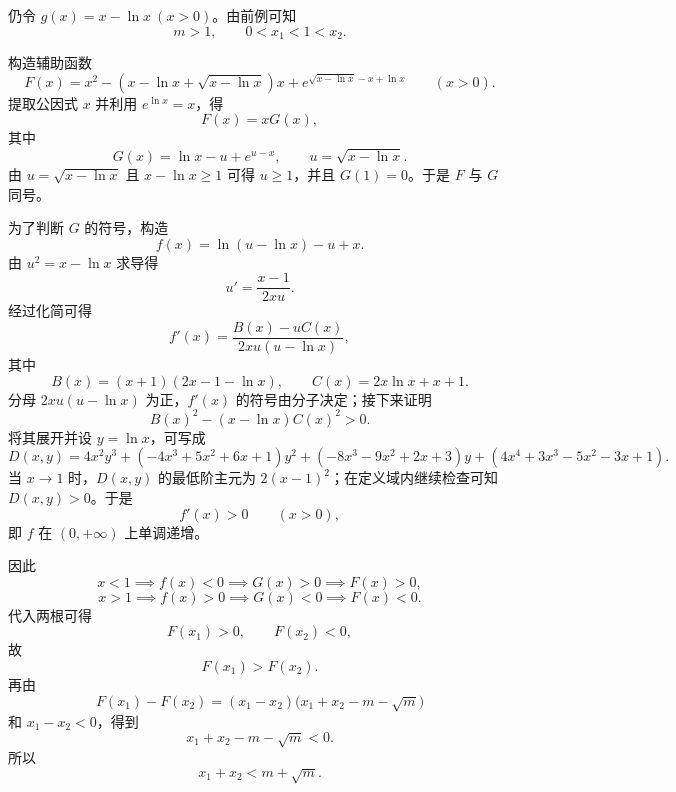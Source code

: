 \begin{solution}
仍令 \(g(x)=x-\ln x\ (x>0)\)。由前例可知
\[
m>1,\qquad 0<x_1<1<x_2.
\]

构造辅助函数
\[
F(x)=x^{2}-(x-\ln x+\sqrt{x-\ln x})x+e^{\sqrt{x-\ln x}-x+\ln x}\qquad(x>0).
\]
提取公因式 \(x\) 并利用 \(e^{\ln x}=x\)，得
\[
F(x)=xG(x),
\]
其中
\[
G(x)=\ln x-u+e^{u-x},\qquad u=\sqrt{x-\ln x}.
\]
由 \(u=\sqrt{x-\ln x}\) 且 \(x-\ln x\ge 1\) 可得 \(u\ge1\)，并且 \(G(1)=0\)。于是 \(F\) 与 \(G\) 同号。

为了判断 \(G\) 的符号，构造
\[
f(x)=\ln(u-\ln x)-u+x.
\]
由 \(u^2=x-\ln x\) 求导得
\[
u'=\frac{x-1}{2xu}.
\]
经过化简可得
\[
f'(x)=\frac{B(x)-uC(x)}{2xu(u-\ln x)},
\]
其中
\[
B(x)=(x+1)(2x-1-\ln x),\qquad C(x)=2x\ln x+x+1.
\]
分母 \(2xu(u-\ln x)\) 为正，\(f'(x)\) 的符号由分子决定；接下来证明
\[
B(x)^2-(x-\ln x)C(x)^2>0.
\]
将其展开并设 \(y=\ln x\)，可写成
\[
D(x,y)=4x^2 y^3 + (-4x^3 + 5x^2 + 6x + 1) y^2 + (-8x^3 - 9x^2 + 2x + 3) y + (4x^4 + 3x^3 - 5x^2 - 3x + 1).
\]
当 \(x\to1\) 时，\(D(x,y)\) 的最低阶主元为 \(2(x-1)^2\)；在定义域内继续检查可知 \(D(x,y)>0\)。于是
\[
f'(x)>0\qquad(x>0),
\]
即 \(f\) 在 \((0,+\infty)\) 上单调递增。

因此
\[
x<1 \implies f(x)<0 \implies G(x)>0 \implies F(x)>0,
\]
\[
x>1 \implies f(x)>0 \implies G(x)<0 \implies F(x)<0.
\]
代入两根可得
\[
F(x_1)>0,\qquad F(x_2)<0,
\]
故
\[
F(x_1)>F(x_2).
\]
再由
\[
F(x_1)-F(x_2)=(x_1-x_2)\bigl(x_1+x_2-m-\sqrt m\bigr)
\]
和 \(x_1-x_2<0\)，得到
\[
x_1+x_2-m-\sqrt m<0.
\]
所以
\[
x_1+x_2<m+\sqrt m.
\]
\end{solution}

